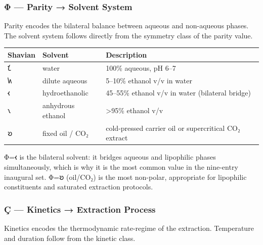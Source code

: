\hypertarget{ux3c6-parity-solvent-system}{%
\subsubsection{Φ --- Parity → Solvent
System}\label{ux3c6-parity-solvent-system}}

Parity encodes the bilateral balance between aqueous and non-aqueous
phases. The solvent system follows directly from the symmetry class of
the parity value.

\begin{longtable}[]{@{}lll@{}}
\toprule
Shavian & Solvent & Description\tabularnewline
\midrule
\endhead
𐑗 & water & 100\% aqueous, pH 6--7\tabularnewline
𐑿 & dilute aqueous & 5--10\% ethanol v/v in water\tabularnewline
𐑬 & hydroethanolic & 45--55\% ethanol v/v in water (bilateral
bridge)\tabularnewline
𐑯 & anhydrous ethanol & \textgreater95\% ethanol v/v\tabularnewline
𐑹 & fixed oil / CO₂ & cold-pressed carrier oil or supercritical CO₂
extract\tabularnewline
\bottomrule
\end{longtable}

Φ=𐑬 is the bilateral solvent: it bridges aqueous and lipophilic phases
simultaneously, which is why it is the most common value in the
nine-entry inaugural set. Φ=𐑹 (oil/CO₂) is the most non-polar,
appropriate for lipophilic constituents and saturated extraction
protocols.

\hypertarget{uxe7-kinetics-extraction-process}{%
\subsubsection{Ç --- Kinetics → Extraction
Process}\label{uxe7-kinetics-extraction-process}}

Kinetics encodes the thermodynamic rate-regime of the extraction.
Temperature and duration follow from the kinetic class.

